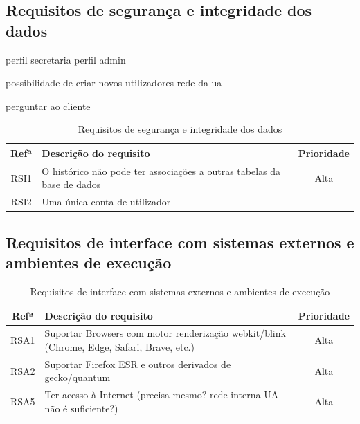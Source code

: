 \documentclass[11pt, twoside]{report}
\begin{document}
	\subsection{Requisitos de segurança e integridade dos dados}
	
	perfil secretaria 
perfil admin

possibilidade de criar novos utilizadores
rede da ua

perguntar ao cliente
\begin{table}[H]	
	\caption{Requisitos de segurança e integridade dos dados}
	
	
	\begin{center}
		\begin{tabularx}{\textwidth}{|c|X|c|}
			\hline
			\textbf{Refª }	& \textbf{Descrição do requisito} & \textbf{Prioridade} \\
			\hline
			RSI1 &O histórico não pode ter associações a outras tabelas da base de dados  &Alta\\
			\hline
			RSI2 & Uma única conta de utilizador&\\
			\hline
		\end{tabularx}
		\label{requisitosdeseguranca}
	\end{center}
\end{table}


	\subsection{Requisitos de interface com sistemas externos e ambientes de execução}
	
	
	
	
	\begin{table}[H]
		\caption{Requisitos de interface com sistemas externos e ambientes de execução}
		\begin{center}
			\begin{tabularx}{\textwidth}{|c|X|c|}
				\hline
				\textbf{Refª }	& \textbf{Descrição do requisito} & \textbf{Prioridade}\\
				\hline
				RSA1 & Suportar Browsers com motor renderização webkit/blink (Chrome, Edge, Safari, Brave, etc.)  & Alta \\
				\hline
				RSA2 & Suportar Firefox ESR e outros derivados de gecko/quantum & Alta \\
				\hline
				RSA5 & Ter acesso à Internet (precisa mesmo? rede interna UA não é suficiente?) & Alta\\
				\hline
			\end{tabularx}
			\label{requisitosdesistemas}
		\end{center}
	\end{table}
		
\end{document}
